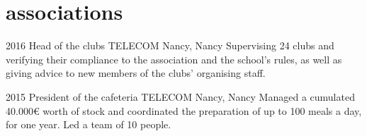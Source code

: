 \documentclass[]{lemaki-cv}
\begin{document}

		\section{associations}

		\begin{entrylist}


			\entry
			{2016}
			{Head of the clubs}
			{TELECOM Nancy, Nancy}
			{Supervising 24 clubs and verifying their compliance to the
			association and the school's rules, as well as giving advice to new
			members of the clubs' organising staff.}


			\entry
			{2015}
			{President of the cafeteria}
			{TELECOM Nancy, Nancy}
			{Managed a cumulated 40.000€ worth of stock and coordinated the
			preparation of up to 100 meals a day, for one year. Led a team of 10
			people.}


		\end{entrylist}
\end{document}
